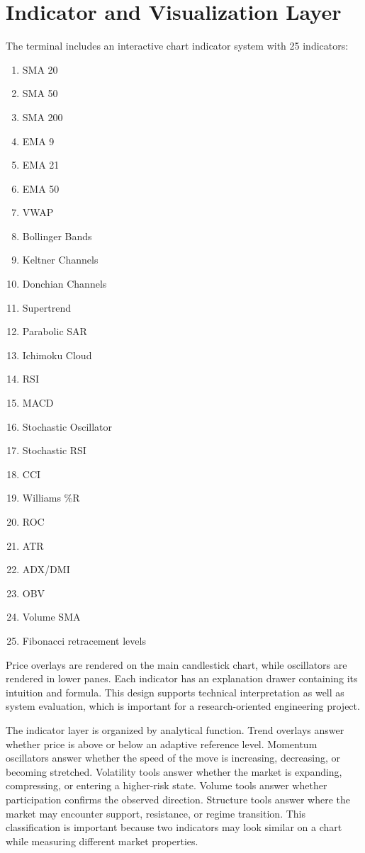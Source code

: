 \documentclass[conference]{IEEEtran}
\begin{document}
\section{Indicator and Visualization Layer}

The terminal includes an interactive chart indicator system with 25
indicators:

\begin{enumerate}
  \item SMA 20
  \item SMA 50
  \item SMA 200
  \item EMA 9
  \item EMA 21
  \item EMA 50
  \item VWAP
  \item Bollinger Bands
  \item Keltner Channels
  \item Donchian Channels
  \item Supertrend
  \item Parabolic SAR
  \item Ichimoku Cloud
  \item RSI
  \item MACD
  \item Stochastic Oscillator
  \item Stochastic RSI
  \item CCI
  \item Williams \%R
  \item ROC
  \item ATR
  \item ADX/DMI
  \item OBV
  \item Volume SMA
  \item Fibonacci retracement levels
\end{enumerate}

Price overlays are rendered on the main candlestick chart, while oscillators
are rendered in lower panes. Each indicator has an explanation drawer
containing its intuition and formula. This design supports technical
interpretation as well as system evaluation, which is important for a
research-oriented engineering project.

The indicator layer is organized by analytical function. Trend overlays
answer whether price is above or below an adaptive reference level. Momentum
oscillators answer whether the speed of the move is increasing, decreasing,
or becoming stretched. Volatility tools answer whether the market is
expanding, compressing, or entering a higher-risk state. Volume tools answer
whether participation confirms the observed direction. Structure tools answer
where the market may encounter support, resistance, or regime transition.
This classification is important because two indicators may look similar on a
chart while measuring different market properties.
\end{document}
